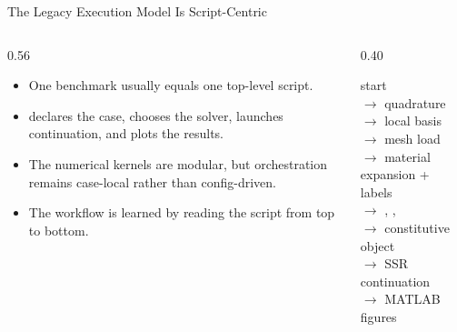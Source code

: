 \documentclass[aspectratio=169,10pt]{beamer}
\begin{document}
\begin{frame}{The Legacy Execution Model Is Script-Centric}
\small
\begin{columns}[T,totalwidth=\textwidth]
\begin{column}{0.56\textwidth}
\begin{softbox}
\begin{itemize}
  \item One benchmark usually equals one top-level script.
  \item {} declares the case, chooses the solver, launches continuation, and plots the results.
  \item The numerical kernels are modular, but orchestration remains case-local rather than config-driven.
  \item The workflow is learned by reading the script from top to bottom.
\end{itemize}
\end{softbox}
\end{column}
\begin{column}{0.40\textwidth}
\begin{pseudobox}
start\\
$\rightarrow$ quadrature\\
$\rightarrow$ local basis\\
$\rightarrow$ mesh load\\
$\rightarrow$ material expansion + labels\\
$\rightarrow$ , , \\
$\rightarrow$ constitutive object\\
$\rightarrow$ SSR continuation\\
$\rightarrow$ MATLAB figures
\end{pseudobox}
\end{column}
\end{columns}
\end{frame}
\end{document}
